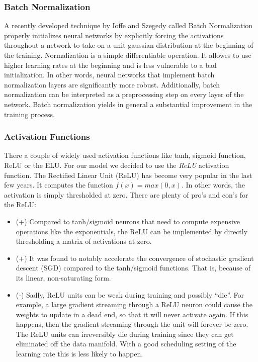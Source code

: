 \documentclass[journal]{IEEEtran}
\begin{document}
\subsubsection{Batch Normalization}
A recently developed technique by Ioffe and Szegedy \cite{RN4} called Batch Normalization  properly initializes neural networks by explicitly forcing the activations throughout a network to take on a unit gaussian distribution at the beginning of the training. Normalization is a simple differentiable operation. 
It allowes to use higher learning rates at the beginning and is less vulnerable to a bad initialization. In other words, neural networks that implement batch normalization layers are significantly more robust. Additionally, batch normalization can be interpreted as a preprocessing step on every layer of the network. Batch normalization yields in general a substantial improvement in the training process. \\
\subsubsection{Activation Functions}
There a couple of widely used activation functions like tanh, sigmoid function, ReLU or the ELU. For our model we decided to use the \textit{ReLU} activation function. The Rectified Linear Unit (ReLU) has become very popular in the last few years. It computes the function \(f(x)=max(0,x)\). In other words, the activation is simply thresholded at zero. There are plenty of pro's and con's for the ReLU:
\begin{itemize}
\item (+) Compared to tanh/sigmoid neurons that need to compute expensive operations  like the exponentials, the ReLU can be implemented by directly thresholding a matrix of activations at zero.
\item (+) It was found to notably accelerate the convergence of stochastic gradient descent (SGD) compared to the tanh/sigmoid functions. That is, because of its linear, non-saturating form.
\item (-) Sadly, ReLU units can be weak during training and possibly “die”. For example, a large gradient streaming through a ReLU neuron could cause the weights to update in a dead end, so that it will never activate again. If this happens, then the gradient streaming through the unit will forever be zero. The ReLU units can irreversibly die during training since they can get eliminated off the data manifold. With a good scheduling setting of the learning rate this is less likely to happen. \\
\end{itemize}
\end{document}
